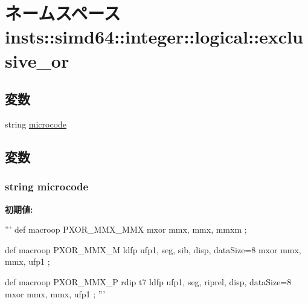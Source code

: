 \hypertarget{namespaceinsts_1_1simd64_1_1integer_1_1logical_1_1exclusive__or}{
\section{ネームスペース insts::simd64::integer::logical::exclusive\_\-or}
\label{namespaceinsts_1_1simd64_1_1integer_1_1logical_1_1exclusive__or}
}
\subsection*{変数}
\begin{DoxyCompactItemize}
\item 
string \hyperlink{namespaceinsts_1_1simd64_1_1integer_1_1logical_1_1exclusive__or_a770f11a173e99389a8802f0107ed8f52}{microcode}
\end{DoxyCompactItemize}


\subsection{変数}
\hypertarget{namespaceinsts_1_1simd64_1_1integer_1_1logical_1_1exclusive__or_a770f11a173e99389a8802f0107ed8f52}{
\subsubsection[{microcode}]{\setlength{\rightskip}{0pt plus 5cm}string {\bf microcode}}}
\label{namespaceinsts_1_1simd64_1_1integer_1_1logical_1_1exclusive__or_a770f11a173e99389a8802f0107ed8f52}
{\bfseries 初期値:}
\begin{DoxyCode}
'''
def macroop PXOR_MMX_MMX {
    mxor mmx, mmx, mmxm
};

def macroop PXOR_MMX_M {
    ldfp ufp1, seg, sib, disp, dataSize=8
    mxor mmx, mmx, ufp1
};

def macroop PXOR_MMX_P {
    rdip t7
    ldfp ufp1, seg, riprel, disp, dataSize=8
    mxor mmx, mmx, ufp1
};
'''
\end{DoxyCode}
